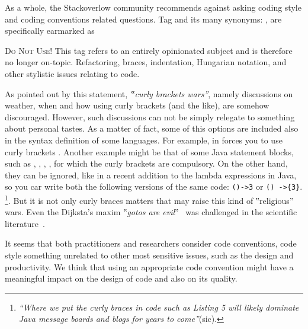 As a whole, the Stackoverlow community
recommends against asking coding style and coding conventions related questions.
Tag  and its many synonyms: ,
 are specifically
earmarked as

\begin{tcolorbox}[colback=green!5!white,colframe=blue!25!white,notitle]
    \textsc{Do Not Use!}
This tag refers to an entirely opinionated subject and is therefore
no longer on-topic. Refactoring, braces, indentation, Hungarian notation, and
other stylistic issues relating to code.
\end{tcolorbox}

As pointed out by this statement, \emph{‟curly brackets wars”}, namely discussions
on weather, when and how using curly brackets (and the like), are somehow discouraged.
However, such discussions can not be simply relegate to something about personal
tastes.
As a matter of fact, some of this options are included also in the syntax definition of some languages.
For example, in \Go forces you to use curly brackets .
Another example might be that of some Java statement blocks, such as , , ,
, for which the curly brackets are compulsory.
On the other hand, they can be ignored, like in a recent addition to
the lambda expressions 
in Java, so you car write both the following versions of the same code: \texttt{()->3} or \texttt{() ->\{3\}}.
\footnote{
\emph{``Where we put the curly braces in code such as Listing 5 will likely dominate Java message boards and blogs for years to come''}(sic).
}.
But it is not only curly braces matters that may raise
this kind of ‟religious” wars. Even the Dijksta's maxim ‟\emph{gotos are evil}”~\cite{Dijkstra:68} 
was challenged in the scientific literature~\cite{Knuth:74,Ramshaw:88,Bochmann:73,Sennesh:Gil:16,Zoethout:79,Wulf:79,Clark:84}.

It seems that both practitioners and researchers consider code conventions, code style
something unrelated to other most sensitive issues, such as the design and productivity.
We think that using an appropriate code convention might have a meaningful impact on the
design of code and also on its quality.

